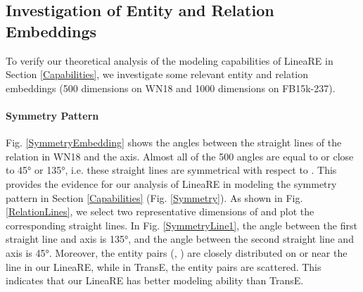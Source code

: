 \documentclass[conference]{IEEEtran}
\begin{document}
\subsection{Investigation of Entity and Relation Embeddings}
To verify our theoretical analysis of the modeling capabilities of LineaRE in Section \ref{Capabilities}, we investigate some relevant entity and relation embeddings (500 dimensions on WN18 and 1000 dimensions on FB15k-237).

\paragraph{Symmetry Pattern}
Fig. \ref{SymmetryEmbedding} shows the angles between the straight lines of the relation  in WN18 and the  axis. Almost all of the 500 angles are equal to or close to 45° or 135°, i.e. these straight lines are symmetrical with respect to . This provides the evidence for our analysis of LineaRE in modeling the symmetry pattern in Section \ref{Capabilities} (Fig. \ref{Symmetry}).
As shown in Fig. \ref{RelationLines}, we select two representative dimensions of  and plot the corresponding straight lines. In Fig. \ref{SymmetryLine1}, the angle between the first straight line and  axis is 135°, and the angle between the second straight line and  axis is 45°. Moreover, the entity pairs (, ) are closely distributed on or near the line in our LineaRE, while in TransE, the entity pairs are scattered. This indicates that our LineaRE has better modeling ability than TransE.
\begin{figure*}[t]
	\centering
	\caption{
		Visualization of the straight lines of  and the entity pairs having the relation of .
	}
	\label{RelationLines}
\end{figure*}
\end{document}

